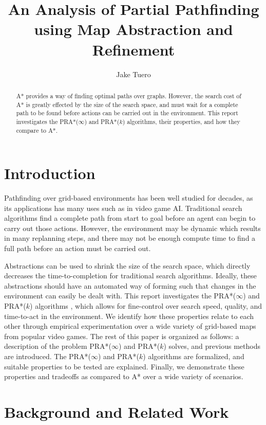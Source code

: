 \documentclass[letterpaper]{article} %
\title{An Analysis of Partial Pathfinding using Map Abstraction and Refinement}
\author{
    Jake Tuero
    \\
}
\begin{document}
\maketitle


\begin{abstract}
A* provides a way of finding optimal paths over graphs.
However, the search cost of A* is greatly effected by the size of the search space,
and must wait for a complete path to be found before actions can be carried out in the environment.
This report investigates the PRA*($\infty$) and PRA*($k$) algorithms, their properties, and how they compare to A*.
\end{abstract}

\section{Introduction}
Pathfinding over grid-based environments has been well studied for decades,
as its applications has many uses such as in video game AI.
Traditional search algorithms find a complete path from start to goal
before an agent can begin to carry out those actions.
However, the environment may be dynamic which results in many replanning steps,
and there may not be enough compute time to find a full path before an action must be carried out.

Abstractions can be used to shrink the size of the search space, 
which directly decreases the time-to-completion for traditional search algorithms.
Ideally, these abstractions should have an automated way of forming such that changes in the environment can easily be dealt with.
This report investigates the PRA*($\infty$) and PRA*($k$) algorithms \cite{sturtevant2005partial},
which allows for fine-control over search speed, quality, and time-to-act in the environment.
We identify how these properties relate to each other 
through empirical experimentation over a wide variety of grid-based maps from popular video games.  
The rest of this paper is organized as follows:
a description of the problem PRA*($\infty$) and PRA*($k$) solves, and previous methods are introduced.
The PRA*($\infty$) and PRA*($k$) algorithms are formalized, and suitable properties to be tested are explained.
Finally, we demonstrate these properties and tradeoffs as compared to A* over a wide variety of scenarios.



\section{Background and Related Work}
\end{document}
